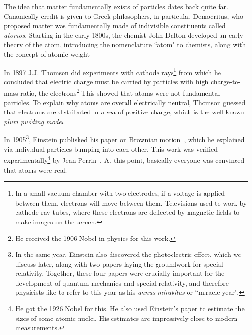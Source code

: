 The idea that matter fundamentally exists of particles dates back quite far.
Canonically credit is given to Greek philosophers, in particular Democritus,
who proposed matter was fundamentally made of indivisible constituents called
{\it atomos}. Starting in the early 1800s, the chemist John Dalton developed an
early theory of the atom, introducing the nomenclature ``atom" to chemists,
along with the concept of atomic weight~\cite{dalton_chemical_1808}. 

In 1897 J.J. Thomson did experiments with cathode rays\footnote{In a small
vacuum chamber with two electrodes, if a voltage is applied between them,
electrons will move between them. Televisions used to work by cathode ray tubes,
 where these electrons are deflected by magnetic fields
to make images on the screen.}
from which he concluded that electric charge must be carried by particles
with high charge-to-mass ratio, the electrons\footnote{He received the 1906
Nobel in physics for this work.}
This showed that atoms were not fundamental particles. 
To explain why atoms are overall electrically neutral, Thomson guessed that
electrons are distributed in a sea of positive charge, which is the
well known {\it plum pudding model}. 

In 1905\footnote{In the same year, Einstein also discovered the
photoelectric effect, which we discuss later, along with two papers
laying the groundwork for special relativity. Together, these four papers were
crucially important for the development of quantum mechanics and special
relativity, and therefore physicists like to refer to this year as
his {\it annus mirabilus} or ``miracle year".}, Einstein published his paper on
Brownian motion~\cite{einstein_uber_1905}, which he explained via individual 
particles bumping into each other. This work was verified
experimentally\footnote{He got the 1926 Nobel for this. He also used Einstein's
paper to estimate the sizes of some atomic nuclei. His estimates are
impressively close to modern measurements.} by
Jean Perrin~\cite{perrin_mouvement_1909}. At this point, basically everyone was
convinced that atoms were real.


